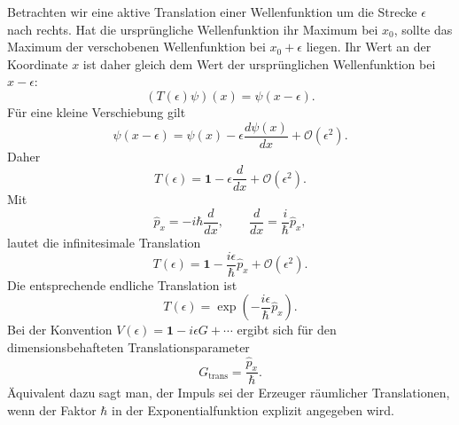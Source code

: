Betrachten wir eine aktive Translation einer Wellenfunktion um die Strecke \(\epsilon\) nach rechts. Hat die ursprüngliche Wellenfunktion ihr Maximum bei \(x_0\), sollte das Maximum der verschobenen Wellenfunktion bei \(x_0+\epsilon\) liegen. Ihr Wert an der Koordinate \(x\) ist daher gleich dem Wert der ursprünglichen Wellenfunktion bei \(x-\epsilon\):
\begin{equation}
(T(\epsilon)\psi)(x)=\psi(x-\epsilon).
\end{equation}
Für eine kleine Verschiebung gilt
\begin{equation}
\psi(x-\epsilon)
=
\psi(x)-\epsilon\frac{d\psi(x)}{dx}
+\mathcal O(\epsilon^2).
\end{equation}
Daher
\begin{equation}
T(\epsilon)
=
\mathbf 1-\epsilon\frac{d}{dx}
+\mathcal O(\epsilon^2).
\end{equation}
Mit
\begin{equation}
\hat p_x=-i\hbar\frac{d}{dx},
\qquad
\frac{d}{dx}=\frac{i}{\hbar}\hat p_x,
\end{equation}
lautet die infinitesimale Translation
\begin{equation}
T(\epsilon)
=
\mathbf 1-\frac{i\epsilon}{\hbar}\hat p_x
+\mathcal O(\epsilon^2).
\end{equation}
Die entsprechende endliche Translation ist
\begin{equation}
T(\epsilon)
=
\exp\left(-\frac{i\epsilon}{\hbar}\hat p_x\right).
\end{equation}
Bei der Konvention \(V(\epsilon)=\mathbf 1-i\epsilon G+\cdots\) ergibt sich für den dimensionsbehafteten Translationsparameter
\begin{equation}
G_{\mathrm{trans}}=\frac{\hat p_x}{\hbar}.
\end{equation}
Äquivalent dazu sagt man, der Impuls sei der Erzeuger räumlicher Translationen, wenn der Faktor \(\hbar\) in der Exponentialfunktion explizit angegeben wird.

\begin{classroomqa}
\end{classroomqa}

